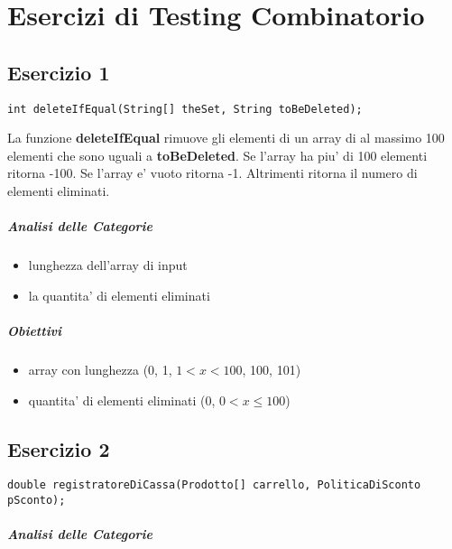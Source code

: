 \chapter{Esercizi di Testing Combinatorio}

\section{Esercizio 1}

\begin{verbatim}
int deleteIfEqual(String[] theSet, String toBeDeleted);
\end{verbatim}

La funzione \textbf{deleteIfEqual} rimuove gli elementi di un array di al massimo 100 elementi che sono uguali a \textbf{toBeDeleted}.
Se l'array ha piu' di 100 elementi ritorna -100. Se l'array e' vuoto ritorna -1. Altrimenti ritorna il numero di elementi eliminati.

\paragraph{Analisi delle Categorie}

\begin{itemize}
  \item lunghezza dell'array di input
  \item la quantita' di elementi eliminati
\end{itemize}

\paragraph{Obiettivi}

\begin{itemize}
  \item array con lunghezza (0, 1, $1 < x < 100$, 100, 101)
  \item quantita' di elementi eliminati (0, $0 < x \leq 100$)
\end{itemize}

\section{Esercizio 2}

\begin{verbatim}
double registratoreDiCassa(Prodotto[] carrello, PoliticaDiSconto pSconto);
\end{verbatim}

\paragraph{Analisi delle Categorie}

